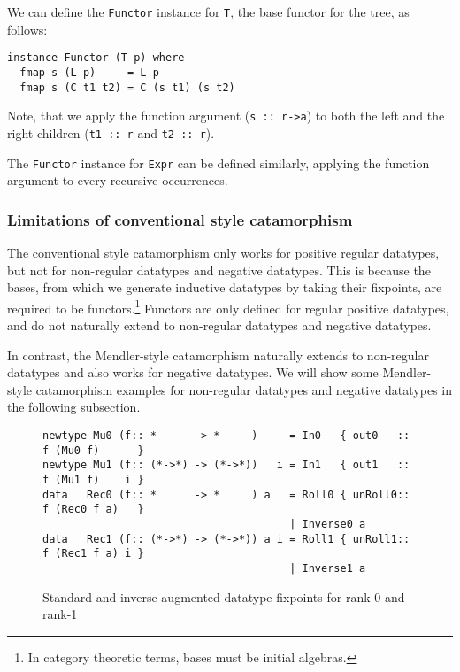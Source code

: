 \documentclass[letterpaper,12pt]{article}
\begin{document}
We can define the \verb|Functor| instance for \verb|T|,
the base functor for the tree, as follows: 
\begin{verbatim}
instance Functor (T p) where
  fmap s (L p)     = L p
  fmap s (C t1 t2) = C (s t1) (s t2)
\end{verbatim}
Note, that we apply the function argument (\verb|s :: r->a|)
to both the left and the right children (\verb|t1 :: r| and \verb|t2 :: r|).

The \verb|Functor| instance for \verb|Expr| can be defined similarly,
applying the function argument to every recursive occurrences.

\subsubsection{Limitations of conventional style catamorphism}
The conventional style catamorphism only works for positive regular datatypes,
but not for non-regular datatypes and negative datatypes.
This is because the bases, from which we generate
inductive datatypes by taking their fixpoints, are required
to be functors.\footnote{In category theoretic terms,
bases must be initial algebras.} Functors are only defined
for regular positive datatypes, and do not naturally extend
to non-regular datatypes and negative datatypes.

In contrast, the Mendler-style catamorphism naturally extends
to non-regular datatypes and also works for negative datatypes.
We will show some Mendler-style catamorphism examples for
non-regular datatypes and negative datatypes
in the following subsection.

\begin{figure}[b]
\begin{verbatim}
newtype Mu0 (f:: *      -> *     )     = In0   { out0   :: f (Mu0 f)      }        
newtype Mu1 (f:: (*->*) -> (*->*))   i = In1   { out1   :: f (Mu1 f)    i } 
data   Rec0 (f:: *      -> *     ) a   = Roll0 { unRoll0:: f (Rec0 f a)   }
                                       | Inverse0 a 
data   Rec1 (f:: (*->*) -> (*->*)) a i = Roll1 { unRoll1:: f (Rec1 f a) i }
                                       | Inverse1 a 
\end{verbatim}
\caption{Standard and inverse augmented datatype fixpoints for rank-0 and rank-1}
\label{fig:datafix}
\end{figure}
\end{document}
